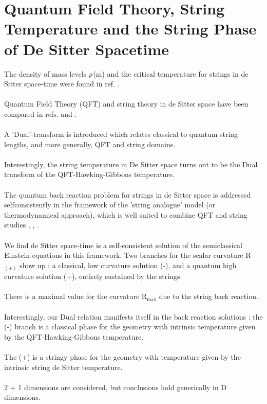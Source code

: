 \documentclass[12pt,a4paper]{article}
\begin{document}
\section{Quantum Field Theory, String Temperature and the String Phase of 
De Sitter Spacetime}
The density of mass levels ${\bf \rho}$(m) and the critical temperature 
for strings in de Sitter space-time were found in ref. \cite{ms1}.\\ \\
Quantum Field Theory (QFT) and string theory in de Sitter space have been 
compared in refs. \cite{ms1} and \cite{ms3}.\\ \\
A 'Dual'-transform is introduced which relates classical to quantum string 
lengths, and more generally, QFT and string domains.\\ \\
Interestingly, the string temperature in De Sitter space turns out to be the 
Dual transform of the QFT-Hawking-Gibbons temperature.\\ \\
The quantum back reaction problem for strings in de Sitter space is addressed 
selfconsistently in the framework of the 'string analogue' model (or 
thermodynamical approach), which is well suited to combine QFT and string 
studies \cite{ms1}, \cite{ms2}, \cite{ms3}.\\ \\
We find de Sitter space-time is a self-consistent solution of the semiclassical Einstein equations in this framework. Two branches for the scalar curvature 
R$_{(\pm)}$ show up : a classical, low curvature solution (-), and a quantum 
high curvature solution (+), entirely sustained by the strings. \\ \\
There is a maximal value for the curvature R$_{\mathrm {max}}$ due to the 
string back reaction.\\ \\
Interestingly, our Dual relation manifests itself in the back reaction 
solutions : the (-) branch is a classical phase for the geometry with intrinsic temperature given by the QFT-Hawking-Gibbons temperature.\\ \\
The (+) is a stringy phase for the geometry with temperature given by the 
intrinsic string de Sitter temperature.\\ \\
2 + 1 dimensions are considered, but conclusions hold generically in D 
dimensions.\\
\end{document}
